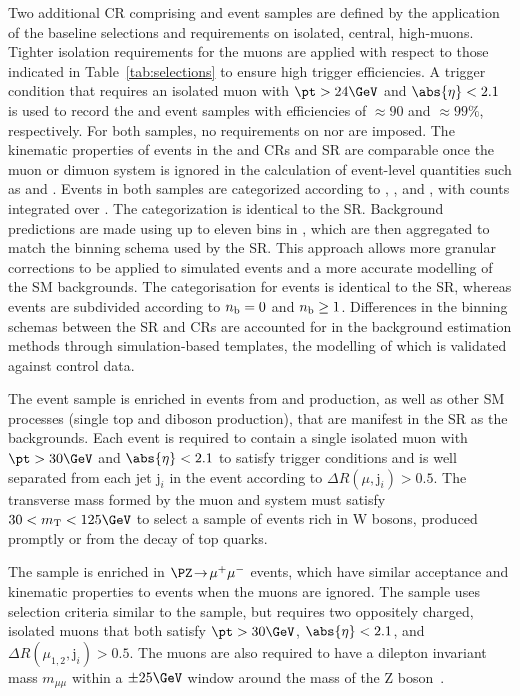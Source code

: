 Two additional CR comprising \mj and \mmj event samples are defined by
the application of the baseline selections and requirements on
isolated, central, high-\pt muons. Tighter isolation requirements for
the muons are applied with respect to those indicated in
Table~\ref{tab:selections} to ensure high trigger efficiencies. A
trigger condition that requires an isolated muon with $\pt > 24\GeV$
and $\abs{\eta} < 2.1$ is used to record the \mj and \mmj event
samples with efficiencies of ${\approx}90$ and ${\approx}99\%$,
respectively. For both samples, no requirements on \alphat nor \bdphi
are imposed. The kinematic properties of events in the \mj and \mmj
CRs and SR are comparable once the muon or dimuon system is ignored in
the calculation of event-level quantities such as \scalht and \mht.
Events in both samples are categorized according to \njet, \scalht,
and \nb, with counts integrated over \mht. The \njet categorization is
identical to the SR. Background predictions are made using up to
eleven bins in \scalht, which are then aggregated to match the \scalht
binning schema used by the SR. This approach allows more granular
corrections to be applied to simulated events and a more accurate
modelling of the SM backgrounds. The \nb categorisation for \mj events
is identical to the SR, whereas \mmj events are subdivided according
to $n_{\text{b}} = 0$ and $n_{\text{b}} \geq 1$. Differences in the binning schemas
between the SR and CRs are accounted for in the background estimation
methods through simulation-based templates, the modelling of which is
validated against control data.

The \mj event sample is enriched in events from \wmj and \ttbar
production, as well as other SM processes (\eg single top and diboson
production), that are manifest in the SR as the \lost
backgrounds. Each event is required to contain a single isolated muon
with $\pt > 30\GeV$ and $\abs{\eta} < 2.1$ to satisfy trigger
conditions and is well separated from each jet $\text{j}_i$ in the
event according to ${\Delta}R(\mu,\text{j}_i) > 0.5$. The transverse
mass formed by the muon \pt and \ptvecmiss system must satisfy $30 <
m_\text{T} < 125\GeV$ to select a sample of events rich in W bosons,
produced promptly or from the decay of top quarks.

The \mmj sample is enriched in $\PZ\! \rightarrow\!  \mu^+\mu^-$
events, which have similar acceptance and kinematic properties to
\znunuj events when the muons are ignored. The sample uses selection
criteria similar to the \mj sample, but requires two oppositely
charged, isolated muons that both satisfy $\pt > 30\GeV$, $\abs{\eta}
< 2.1$, and ${\Delta}R(\mu_{1,2},\text{j}_i) > 0.5$. The muons are
also required to have a dilepton invariant mass $m_{\mu\mu}$ within a
${\pm}25\GeV$ window around the mass of the Z
boson~\cite{1674-1137-38-9-090001}.

